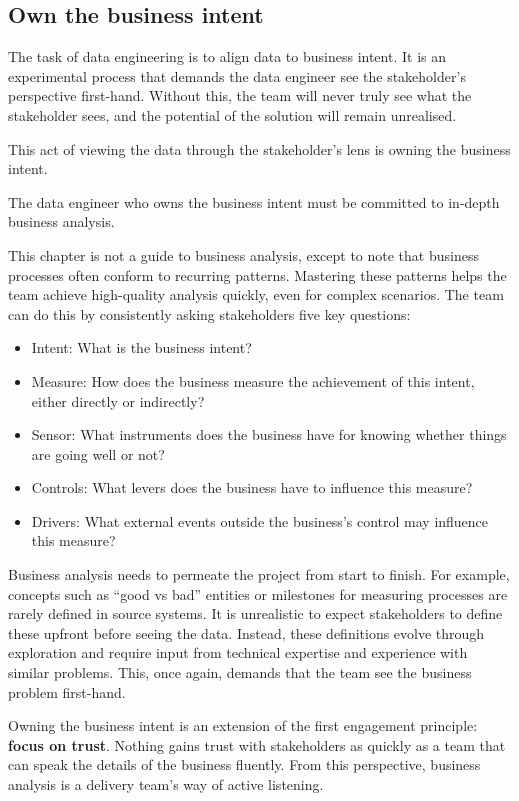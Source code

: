 \documentclass[10pt,openany,10pt]{book}
\providecommand{\tightlist}{%
  \setlength{\itemsep}{0pt}\setlength{\parskip}{0pt}}
\begin{document}
\subsection{Own the business intent}\label{own-the-business-intent}

The task of data engineering is to align data to business intent. It is
an experimental process that demands the data engineer see the
stakeholder's perspective first-hand. Without this, the team will never
truly see what the stakeholder sees, and the potential of the solution
will remain unrealised.

This act of viewing the data through the stakeholder's lens is owning
the business intent.

The data engineer who owns the business intent must be committed to
in-depth business analysis.

This chapter is not a guide to business analysis, except to note that
business processes often conform to recurring patterns. Mastering these
patterns helps the team achieve high-quality analysis quickly, even for
complex scenarios. The team can do this by consistently asking
stakeholders five key questions:

\begin{itemize}
\tightlist
\item
  Intent: What is the business intent?
\item
  Measure: How does the business measure the achievement of this intent,
  either directly or indirectly?
\item
  Sensor: What instruments does the business have for knowing whether
  things are going well or not?
\item
  Controls: What levers does the business have to influence this
  measure?
\item
  Drivers: What external events outside the business's control may
  influence this measure?
\end{itemize}

Business analysis needs to permeate the project from start to finish.
For example, concepts such as ``good vs bad'' entities or milestones for
measuring processes are rarely defined in source systems. It is
unrealistic to expect stakeholders to define these upfront before seeing
the data. Instead, these definitions evolve through exploration and
require input from technical expertise and experience with similar
problems. This, once again, demands that the team see the business
problem first-hand.

Owning the business intent is an extension of the first engagement
principle: \textbf{focus on trust}. Nothing gains trust with
stakeholders as quickly as a team that can speak the details of the
business fluently. From this perspective, business analysis is a
delivery team's way of active listening.
\end{document}
